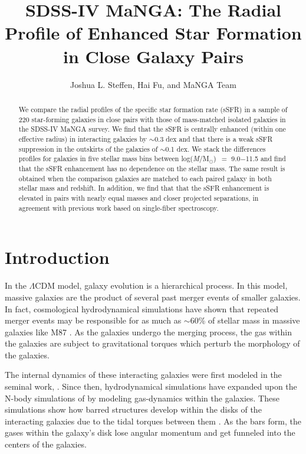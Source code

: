 \documentclass[iop,revtex4,twocolumn,apj,numberedappendix,appendixfloats]{emulateapj}
\newcommand{\logm}{log({\it M}/M$_{\odot}$)}
\begin{document}
\title{
SDSS-IV MaNGA: The Radial Profile of Enhanced Star Formation in Close Galaxy Pairs
}

\author{
Joshua L. Steffen, 
Hai Fu, and 
MaNGA Team 
}

\begin{abstract}
We compare the radial profiles of the specific star formation rate (sSFR) in a sample of 220 star-forming galaxies in close pairs with those of mass-matched isolated galaxies in the SDSS-IV MaNGA survey. We find that the sSFR is centrally enhanced (within one effective radius) in interacting galaxies by $\sim$0.3 dex and that there is a weak sSFR suppression in the outskirts of the galaxies of $\sim$0.1 dex. We stack the differences profiles for galaxies in five stellar mass bins between \logm\ $=$ 9.0$-$11.5 and find that the sSFR enhancement has no dependence on the stellar mass. The same result is obtained when the comparison galaxies are matched to each paired galaxy in both stellar mass and redshift. In addition, we find that that the sSFR enhancement is elevated in pairs with nearly equal masses and closer projected separations, in agreement with previous work based on single-fiber spectroscopy.
\end{abstract}


\section{Introduction}\label{sec:intro}

In the $\Lambda$CDM model, galaxy evolution is a hierarchical process. In this model, massive galaxies are the product of several past merger events of smaller galaxies. In fact, cosmological hydrodynamical simulations have shown that repeated merger events may be responsible for as much as $\sim$60\% of stellar mass in massive galaxies like M87 \citep[e.g.,][]{Rodriguez-Gomez:2016,Pillepich:2018}. As the galaxies undergo the merging process, the gas within the galaxies are subject to gravitational torques which perturb the morphology of the galaxies.

The internal dynamics of these interacting galaxies were first modeled in the seminal work, \citet{Toomre:1972}. Since then, hydrodynamical simulations have expanded upon the N-body simulations of \citet{Toomre:1972} by modeling gas-dynamics within the galaxies. These simulations show how barred structures develop within the disks of the interacting galaxies due to the tidal torques between them \citep{Barnes:1991}. As the bars form, the gases within the galaxy's disk lose angular momentum and get funneled into the centers of the galaxies. 
\end{document}
